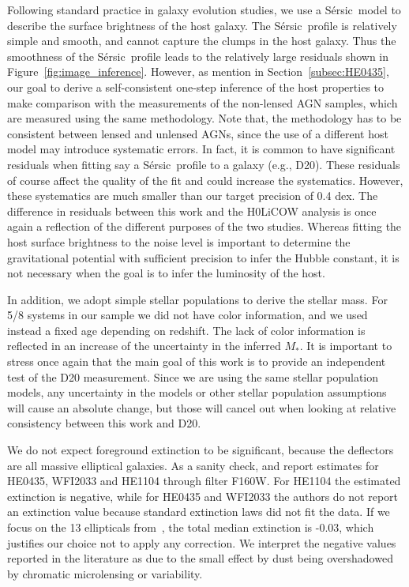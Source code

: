 \documentclass[fleqn,usenatbib]{mnras}
\newcommand{\sersic}{S\'ersic}
\newcommand{\mstar}{{$M_*$}}
\begin{document}
{Following standard practice in galaxy evolution studies, we use a \sersic\ model to describe the surface brightness of the host galaxy. The \sersic\ profile is relatively simple and smooth, and cannot capture the clumps in the host galaxy. Thus the smoothness of the \sersic\ profile leads to the relatively large residuals shown in Figure~\ref{fig:image_inference}. However, as mention in Section~\ref{subsec:HE0435}, our goal to derive a self-consistent one-step inference of the host properties to make comparison with the measurements of the non-lensed AGN samples, which are measured using the same methodology. Note that, the methodology has to be consistent between lensed and unlensed AGNs, since the use of a different host model may introduce systematic errors. In fact, it is common to have significant residuals when fitting say a \sersic\ profile to a galaxy (e.g., D20). These residuals of course affect the quality of the fit and could increase the systematics. However, these systematics are much smaller than our target precision of 0.4 dex.  The difference in residuals between this work and the H0LiCOW analysis is once again a reflection of the different purposes of the two studies. Whereas fitting the host surface brightness to the noise level is important to determine the gravitational potential with sufficient precision to infer the Hubble constant, it is not necessary when the goal is to infer the luminosity of the host.

In addition, we adopt simple stellar populations to derive the stellar mass. For 5/8 systems in our sample we did not have color information, and we used instead a fixed age depending on redshift. The lack of color information is reflected in an increase of the uncertainty in the inferred \mstar. It is important to stress once again that the main goal of this work is to provide an independent test of the D20 measurement. Since we are using the same stellar population models, any uncertainty in the models or other stellar population assumptions will cause an absolute change, but those will cancel out when looking at relative consistency between this work and D20.

We do not expect foreground extinction to be significant, because the deflectors are all massive elliptical galaxies. As a sanity check, \citet{1999ApJ...523..617F} and \citet{2008A&A...485..403O} report estimates for HE0435, WFI2033 and HE1104 through filter F160W. For HE1104 the estimated extinction is negative, while for HE0435 and WFI2033 the authors do not report an extinction value because standard extinction laws did not fit the data.
If we focus on the 13 ellipticals from~\citet{1999ApJ...523..617F}, the total median extinction is -0.03, which justifies our choice not to apply any correction.
We interpret the negative values reported in the literature as due to the small effect by dust being overshadowed by chromatic microlensing or variability.

}
\end{document}
